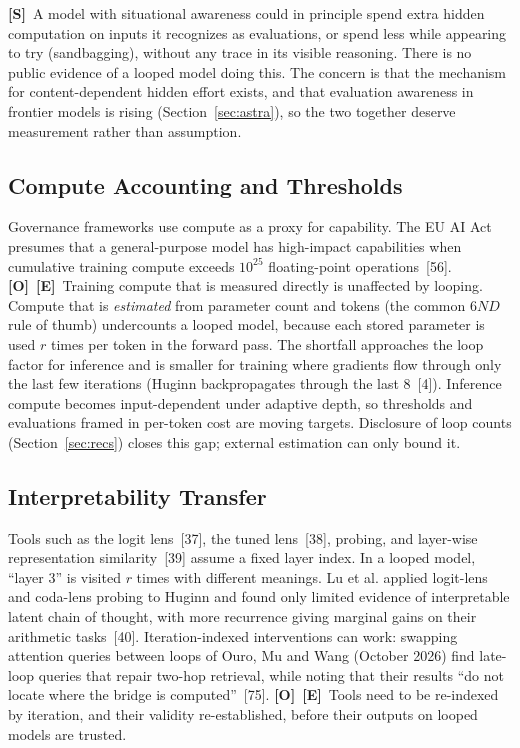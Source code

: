 \documentclass[11pt,letterpaper]{article}
\newcommand{\mO}{\textcolor{sensorteal}{\textbf{[O]}}}
\newcommand{\mE}{\textcolor{deepindigo}{\textbf{[E]}}}
\newcommand{\mS}{\textcolor{darkamber}{\textbf{[S]}}}
\begin{document}
\mS\ A model with situational awareness could in principle spend extra hidden computation on inputs it recognizes as evaluations, or spend less while appearing to try (sandbagging), without any trace in its visible reasoning. There is no public evidence of a looped model doing this. The concern is that the mechanism for content-dependent hidden effort exists, and that evaluation awareness in frontier models is rising (Section~\ref{sec:astra}), so the two together deserve measurement rather than assumption.

\subsection{Compute Accounting and Thresholds}

Governance frameworks use compute as a proxy for capability. The EU AI Act presumes that a general-purpose model has high-impact capabilities when cumulative training compute exceeds $10^{25}$ floating-point operations~[56]. \mO\ \mE\ Training compute that is measured directly is unaffected by looping. Compute that is \emph{estimated} from parameter count and tokens (the common $6ND$ rule of thumb) undercounts a looped model, because each stored parameter is used $r$ times per token in the forward pass. The shortfall approaches the loop factor for inference and is smaller for training where gradients flow through only the last few iterations (Huginn backpropagates through the last 8~[4]). Inference compute becomes input-dependent under adaptive depth, so thresholds and evaluations framed in per-token cost are moving targets. Disclosure of loop counts (Section~\ref{sec:recs}) closes this gap; external estimation can only bound it.

\subsection{Interpretability Transfer}

Tools such as the logit lens~[37], the tuned lens~[38], probing, and layer-wise representation similarity~[39] assume a fixed layer index. In a looped model, ``layer 3'' is visited $r$ times with different meanings. Lu et al. applied logit-lens and coda-lens probing to Huginn and found only limited evidence of interpretable latent chain of thought, with more recurrence giving marginal gains on their arithmetic tasks~[40]. Iteration-indexed interventions can work: swapping attention queries between loops of Ouro, Mu and Wang (October 2026) find late-loop queries that repair two-hop retrieval, while noting that their results ``do not locate where the bridge is computed''~[75]. \mO\ \mE\ Tools need to be re-indexed by iteration, and their validity re-established, before their outputs on looped models are trusted.
\end{document}
